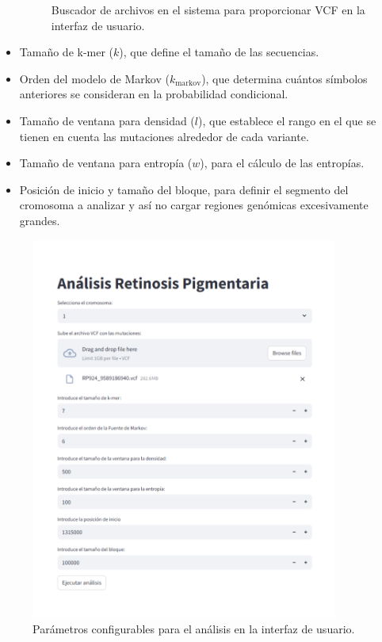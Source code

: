 \documentclass[11pt,spanish,listoffigures,listoftables]{tfgetsinf}
\begin{document}
\begin{itemize}
\begin{figure}[H]
      \caption{Buscador de archivos en el sistema para proporcionar \acs{VCF} en la interfaz de usuario.}
      \label{fig:etiqueta_opcional7}
   \end{figure}
   \item Tamaño de k-mer ($k$), que define el tamaño de las secuencias. 
   \item Orden del modelo de Markov ($k_{\text{markov}}$), que determina cuántos símbolos anteriores se consideran en la probabilidad condicional.
   \item Tamaño de ventana para densidad ($l$), que establece el rango en el que se tienen en cuenta las mutaciones alrededor de cada variante. 
   \item Tamaño de ventana para entropía ($w$), para el cálculo de las entropías.
   \item Posición de inicio y tamaño del bloque, para definir el segmento del cromosoma a analizar y así no cargar regiones genómicas excesivamente grandes. 
\end{itemize}

\begin{figure}[H]
      \centering
      \includegraphics[width=0.9\textwidth]{Analisis_RP.png}
      \caption{Parámetros configurables para el análisis en la interfaz de usuario.}
      \label{fig:etiqueta_opcional8}
   \end{figure}
 
\end{document}
